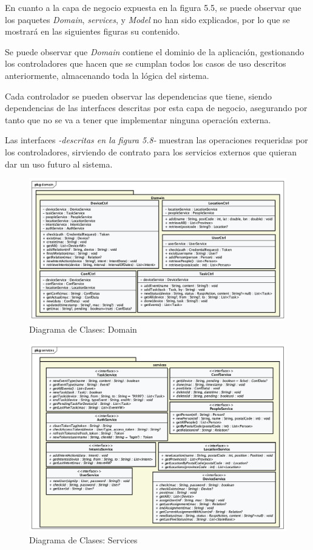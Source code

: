     En cuanto a la capa de negocio expuesta en la figura 5.5, se puede observar que los paquetes \textit{Domain}, \textit{services}, y \textit{Model} no han sido explicados, por lo que se mostrará en las siguientes figuras su contenido.
    
    Se puede observar que \textit{Domain} contiene el dominio de la aplicación, gestionando los controladores que hacen que se cumplan todos los casos de uso descritos anteriormente, almacenando toda la lógica del sistema.
    
    Cada controlador se pueden observar las dependencias que tiene, siendo dependencias de las interfaces descritas por esta capa de negocio, asegurando por tanto que no se va a tener que implementar ninguna operación externa.

    Las interfaces \textit{-descritas en la figura 5.8-} muestran las operaciones requeridas por los controladores, sirviendo de contrato para los servicios externos que quieran dar un uso futuro al sistema.
    
    \begin{figure}[H]
        \centering
        \includegraphics[width=13cm]{./img/arch/back/dc.domain.png}
        \caption{Diagrama de Clases: Domain}
        \label{fig:dc.domain}
    \end{figure}
        
    \begin{figure}[H]
        \centering
        \includegraphics[width=14cm]{./img/arch/back/dc.services.png}
        \caption{Diagrama de Clases: Services}
        \label{fig:dc.services}
    \end{figure}

